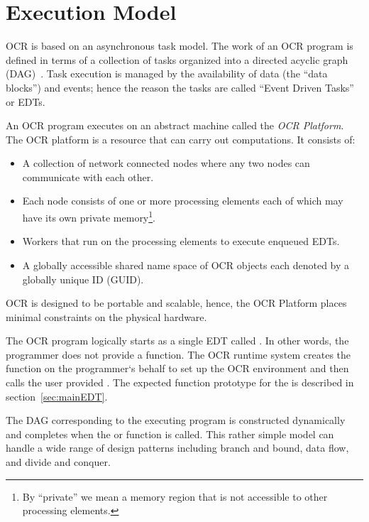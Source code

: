 %
\section{Execution Model}
\label{sec:ExecutionModel}

OCR is based on an asynchronous task model. The work of an OCR program
is defined in terms of a collection of tasks organized
into a directed acyclic graph (DAG)~\cite{TaSa11,Tasirlar11,Zuckerman:2011:UCP:2000417.2000424}.
Task execution is managed by the availability of data (the ``data
blocks'') and events; hence the reason the tasks are called ``Event
Driven Tasks'' or EDTs.

An OCR program executes on an abstract machine called the \emph{OCR
Platform}. The OCR platform is a resource that can carry out
computations. It consists of:
\begin{itemize}
\item A collection of network connected nodes where any two nodes can
communicate with each other.
\item Each node consists of one or more processing elements each of
which may have its own private memory\footnote{By ``private'' we mean a
memory region that is not accessible to other processing
elements.}.
\item Workers that run on the processing elements to execute enqueued EDTs.
\item A globally accessible shared name space of OCR objects each
denoted by a globally unique ID (GUID).
\end{itemize}
OCR is designed to be portable and scalable, hence, the OCR Platform
places minimal constraints on the physical hardware.



The OCR program logically starts as a single EDT called .
In other words, the programmer does not provide a  function.
The OCR runtime system creates the  function on the programmer`s
behalf to set up the OCR environment and then calls the user provided
. The expected function prototype for the
 is described in section~\ref{sec:mainEDT}.

The DAG corresponding to the executing program is constructed
dynamically and completes when the
 or  function is called.
This rather simple model can handle a wide range of
design patterns including branch and bound, data flow, and divide and
conquer.
%

